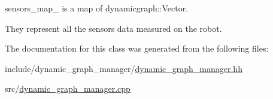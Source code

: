 sensors\+\_\+map\+\_\+ is a map of dynamicgraph\+::\+Vector. 

They represent all the sensors data measured on the robot. 

The documentation for this class was generated from the following files\+:\begin{DoxyCompactItemize}
\item 
include/dynamic\+\_\+graph\+\_\+manager/\hyperlink{dynamic__graph__manager_8hh}{dynamic\+\_\+graph\+\_\+manager.\+hh}\item 
src/\hyperlink{dynamic__graph__manager_8cpp}{dynamic\+\_\+graph\+\_\+manager.\+cpp}\end{DoxyCompactItemize}
